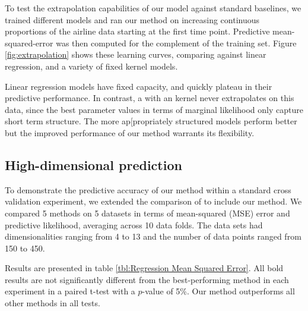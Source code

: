 \documentclass[twoside]{article}
\begin{document}

To test the extrapolation capabilities of our model against standard baselines, we trained different models and ran our method on increasing continuous proportions of the airline data starting at the first time point.
Predictive mean-squared-error was then computed for the complement of the training set.
Figure \ref{fig:extrapolation} shows these learning curves, comparing against linear regression, and a variety of fixed kernel \gp{} models.  

Linear regression models have fixed capacity, and quickly plateau in their predictive performance.
In contrast, a \gp{} with an \kSE{} kernel never extrapolates on this data, since the best parameter values in terms of marginal likelihood only capture short term structure.
The more ap[propriately structured \gp{} models perform better but the improved performance of our method warrants its flexibility.



\subsection{High-dimensional prediction}

To demonstrate the predictive accuracy of our method within a standard cross validation experiment, we extended the comparison of \cite{duvenaud2011additive11} to include our method.
We compared 5 methods on 5 datasets in terms of mean-squared (MSE) error and predictive likelihood, averaging across 10 data folds.
The data sets had dimensionalities ranging from 4 to 13 and the number of data points ranged from 150 to 450.

Results are presented in table \ref{tbl:Regression Mean Squared Error}.
All bold results are not significantly different from the best-performing method in each experiment in a paired t-test with a $p$-value of 5\%.
Our method outperforms all other methods in all tests.
%
%
%

%
\end{document}

